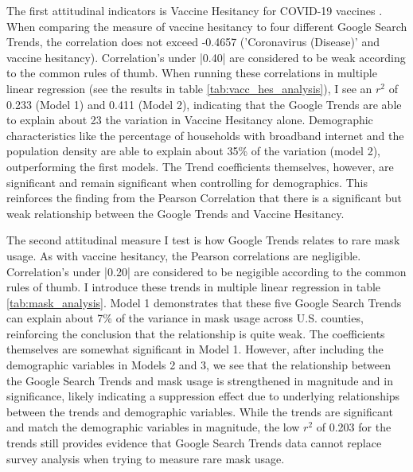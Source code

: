 


The first attitudinal indicators is Vaccine Hesitancy for COVID-19 vaccines
\citep{vaches_data}. When comparing the measure of vaccine hesitancy to four
different Google Search Trends, the correlation does not exceed -0.4657
('Coronavirus (Disease)' and vaccine hesitancy). Correlation's under |0.40| are
considered to be weak according to the common rules of thumb. When running these
correlations in multiple linear regression (see the results in table
\ref{tab:vacc_hes_analysis}), I see an $r^2$ of 0.233 (Model 1) and 0.411
(Model 2), indicating that the Google Trends are able to explain about 23%
the variation in Vaccine Hesitancy alone. Demographic characteristics like the
percentage of households with broadband internet and the population density are
able to explain about 35\% of the variation (model 2), outperforming the first
models. The Trend coefficients themselves, however, are significant and remain
significant when controlling for demographics. This reinforces the finding from
the Pearson Correlation that there is a significant but weak relationship
between the Google Trends and Vaccine Hesitancy.



The second attitudinal measure I test is how Google Trends relates to rare mask
usage. As with vaccine hesitancy, the Pearson correlations are negligible.
Correlation's under |0.20| are considered to be negigible according to the
common rules of thumb. I introduce these trends in multiple linear regression in
table \ref{tab:mask_analysis}. Model 1 demonstrates that these five Google
Search Trends can explain about 7\% of the variance in mask usage across U.S.
counties, reinforcing the conclusion that the relationship is quite weak. The
coefficients themselves are somewhat significant in Model 1. However, after
including the demographic variables in Models 2 and 3, we see that the
relationship between the Google Search Trends and mask usage is strengthened in
magnitude and in significance, likely indicating a suppression effect due to
underlying relationships between the trends and demographic variables. While the
trends are significant and match the demographic variables in magnitude, the
low $r^2$ of 0.203 for the trends still provides evidence that Google Search
Trends data cannot replace survey analysis when trying to measure rare mask
usage.

